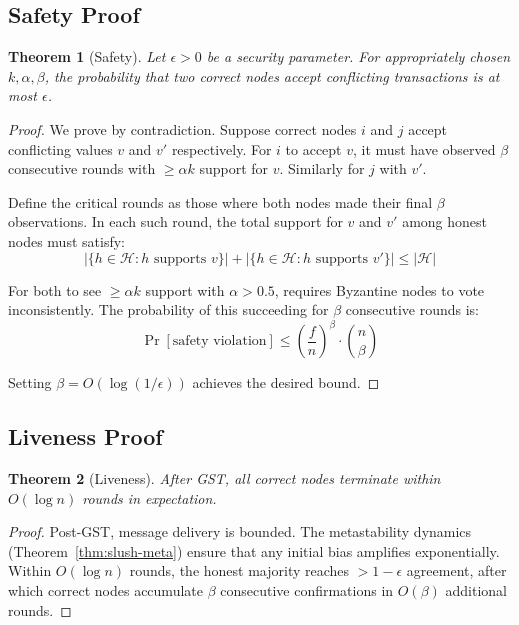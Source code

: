 \documentclass[11pt,a4paper]{article}
\newtheorem{theorem}{Theorem}
\begin{document}
\subsection{Safety Proof}

\begin{theorem}[Safety]
\label{thm:safety}
Let $\epsilon > 0$ be a security parameter. For appropriately chosen $k, \alpha, \beta$, the probability that two correct nodes accept conflicting transactions is at most $\epsilon$.
\end{theorem}

\begin{proof}
We prove by contradiction. Suppose correct nodes $i$ and $j$ accept conflicting values $v$ and $v'$ respectively. For $i$ to accept $v$, it must have observed $\beta$ consecutive rounds with $\geq \alpha k$ support for $v$. Similarly for $j$ with $v'$.

Define the critical rounds as those where both nodes made their final $\beta$ observations. In each such round, the total support for $v$ and $v'$ among honest nodes must satisfy:
\begin{equation}
|\{h \in \mathcal{H} : h \text{ supports } v\}| + |\{h \in \mathcal{H} : h \text{ supports } v'\}| \leq |\mathcal{H}|
\end{equation}

For both to see $\geq \alpha k$ support with $\alpha > 0.5$, requires Byzantine nodes to vote inconsistently. The probability of this succeeding for $\beta$ consecutive rounds is:
\begin{equation}
\Pr[\text{safety violation}] \leq \left(\frac{f}{n}\right)^\beta \cdot \binom{n}{\beta}
\end{equation}

Setting $\beta = O(\log(1/\epsilon))$ achieves the desired bound.
\end{proof}

\subsection{Liveness Proof}

\begin{theorem}[Liveness]
\label{thm:liveness}
After GST, all correct nodes terminate within $O(\log n)$ rounds in expectation.
\end{theorem}

\begin{proof}
Post-GST, message delivery is bounded. The metastability dynamics (Theorem~\ref{thm:slush-meta}) ensure that any initial bias amplifies exponentially. Within $O(\log n)$ rounds, the honest majority reaches $> 1 - \epsilon$ agreement, after which correct nodes accumulate $\beta$ consecutive confirmations in $O(\beta)$ additional rounds.
\end{proof}
\end{document}
